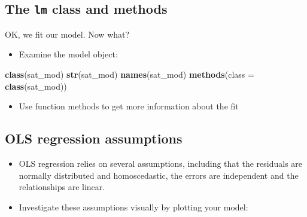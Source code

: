 \documentclass[]{book}
\newenvironment{Shaded}{\begin{snugshade}}{\end{snugshade}}
\newcommand{\KeywordTok}[1]{\textcolor[rgb]{0.13,0.29,0.53}{\textbf{#1}}}
\newcommand{\DataTypeTok}[1]{\textcolor[rgb]{0.13,0.29,0.53}{#1}}
\newcommand{\StringTok}[1]{\textcolor[rgb]{0.31,0.60,0.02}{#1}}
\newcommand{\OperatorTok}[1]{\textcolor[rgb]{0.81,0.36,0.00}{\textbf{#1}}}
\newcommand{\NormalTok}[1]{#1}
\providecommand{\tightlist}{%
  \setlength{\itemsep}{0pt}\setlength{\parskip}{0pt}}
\begin{document}
\subsection{\texorpdfstring{The \texttt{lm} class and
methods}{The lm class and methods}}\label{the-lm-class-and-methods}

OK, we fit our model. Now what?

\begin{itemize}
\tightlist
\item
  Examine the model object:
\end{itemize}

\begin{Shaded}
\begin{Highlighting}[]
  \KeywordTok{class}\NormalTok{(sat_mod)}
  \KeywordTok{str}\NormalTok{(sat_mod)}
  \KeywordTok{names}\NormalTok{(sat_mod)}
  \KeywordTok{methods}\NormalTok{(}\DataTypeTok{class =} \KeywordTok{class}\NormalTok{(sat_mod))}
\end{Highlighting}
\end{Shaded}

\begin{itemize}
\tightlist
\item
  Use function methods to get more information about the fit
\end{itemize}

\begin{Shaded}
\end{Shaded}

\subsection{OLS regression
assumptions}\label{ols-regression-assumptions}

\begin{itemize}
\tightlist
\item
  OLS regression relies on several assumptions, including that the
  residuals are normally distributed and homoscedastic, the errors are
  independent and the relationships are linear.
\item
  Investigate these assumptions visually by plotting your model:
\end{itemize}
\end{document}
